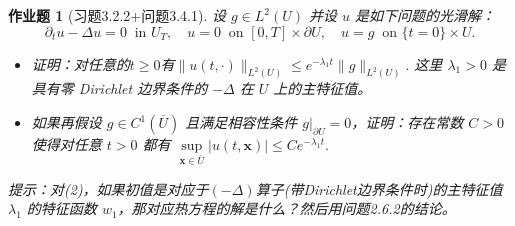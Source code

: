\documentclass[UTF8,fontset=windows,12pt]{ctexart}
\theoremstyle{kaiti-theorem}
\newtheorem{problem}{作业题}
\numberwithin{equation}{section}
\newcommand{\R}{\mathbb{R}}
\newcommand{\bds}[1]{\boldsymbol{#1}}  %
\newcommand{\ub}{{\overline{U}}}
\newcommand{\p}{\partial}
\newcommand{\lap}{\Delta}
\newcommand{\lam}{\lambda}
\newcommand{\xx}{{\bds{x}}}
\begin{document}
\begin{problem}[习题3.2.2+问题3.4.1]
设 $g\in L^2(U)$ 并设 $u$ 是如下问题的光滑解：
\begin{equation}
\p_t u - \lap u =0~\text{ in }U_T,\quad u=0~\text{ on }[0,T]\times\p U,\quad u=g~\text{ on }\{t=0\}\times U.
\end{equation}
\begin{itemize}
\item [(1)] 证明：对任意的$t\geqslant 0$有$\|u(t,\cdot)\|_{L^2(U)}\leqslant e^{-\lam_1 t}\|g\|_{L^2(U)}.$ 这里 $\lam_1>0$ 是具有零 Dirichlet 边界条件的 $-\lap$ 在 $U$ 上的主特征值。
\item [(2)] 如果再假设 $g\in C^1(\ub)$ 且满足相容性条件 $g|_{\p U}=0$，证明：存在常数 $C>0$ 使得对任意 $t>0$ 都有 $\sup\limits_{\xx\in \ub}|u(t,\xx)|\leqslant Ce^{-\lam_1 t}.$
\end{itemize}
提示：对(2)，如果初值是对应于$(-\lap)$算子(带Dirichlet边界条件时)的主特征值 $\lam_1$ 的特征函数 $w_1$，那对应热方程的解是什么？然后用问题2.6.2的结论。
\end{problem}

\end{document}
